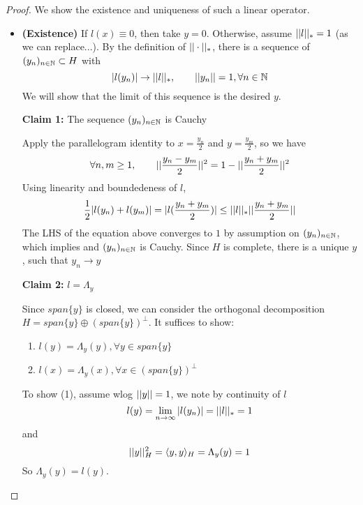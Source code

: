 \documentclass{article}
\begin{document}
\begin{proof}
    We show the existence and uniqueness of such a linear operator.  
    \begin{itemize}
        \item \textbf{(Existence)} If $l(x)\equiv 0$, then take $y=0$. Otherwise, assume $||l||_*=1$ (as we can replace...).  
        By the definition of $||\cdot||_*$, there is a sequence of $(y_n)_{n\in \mathbb{N}} \subset H$ with  
        \begin{equation*}
            |l(y_n)| \to ||l||_*, \qquad ||y_n||=1, \forall n \in \mathbb{N}
        \end{equation*}
        We will show that the limit of this sequence is the desired $y$.  
        
        \textbf{Claim 1:} The sequence $(y_n)_{n \in \mathbb{N}}$ is Cauchy   
        
        Apply the parallelogram identity to $x = \frac{y_n}{2}$ and $y = \frac{y_m}{2}$, so we have  
        \begin{equation*}
            \forall n,m \geq 1, \qquad ||\frac{y_n-y_m}{2}||^2=1-||\frac{y_n+y_m}{2}||^2
        \end{equation*}  
        Using linearity and boundedeness of $l$,   
        \begin{equation*}
            \frac{1}{2} |l(y_n)+l(y_m)| = |l(\frac{y_n+y_m}{2})| \leq ||l||_* ||\frac{y_n+y_m}{2}||
        \end{equation*}  
        The LHS of the equation above converges to $1$ by assumption on $(y_n)_{n \in \mathbb{N}}$, which implies and $(y_n)_{n \in \mathbb{N}}$ is Cauchy.  
        Since $H$ is complete, there is a unique $y$, such that $y_n \to y$  
        
        \textbf{Claim 2:} $l=\Lambda_y$  
        
        Since $span\{y\}$ is closed, we can consider the orthogonal decomposition $H = span\{y\} \oplus (span\{y\})^{\perp}$.  
        It suffices to show:  
        \begin{enumerate}[(1)]
            \item $l(y)=\Lambda_y(y), \forall y \in span\{y\}$
            \item $l(x)=\Lambda_y(x), \forall x \in (span\{y\})^{\perp}$
        \end{enumerate}  
        To show (1), assume wlog $||y||=1$, we note by continuity of $l$  
        \begin{equation*}
            l(y) = \lim_{n \to \infty} |l(y_n)| = ||l||_*=1
        \end{equation*}  
        and 
        \begin{equation*}
            ||y||^2_H = \langle y, y \rangle_H =\Lambda_y(y)=1
        \end{equation*}  
        So $\Lambda_y(y)=l(y)$.  
        

\end{itemize}
\end{proof}
\end{document}
